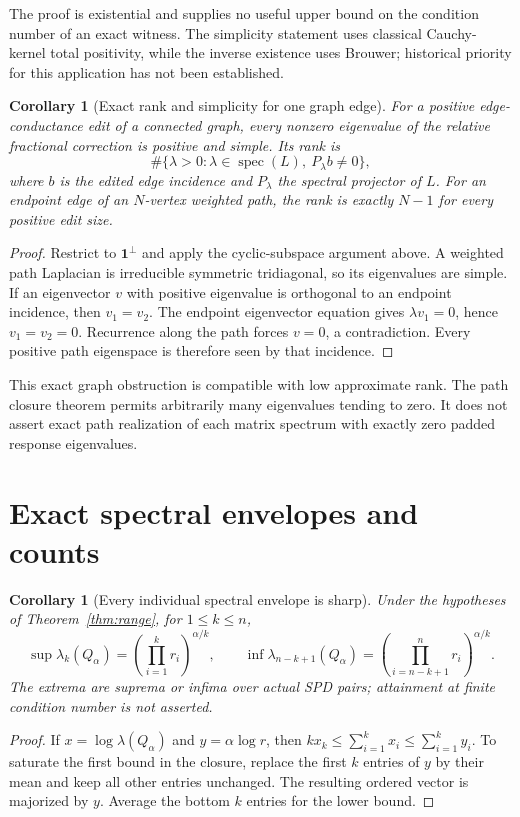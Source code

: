 \documentclass[11pt]{article}
\newtheorem{corollary}[theorem]{Corollary}
\newcommand{\spec}{\operatorname{spec}}
\begin{document}
The proof is existential and supplies no useful upper bound on the
condition number of an exact witness. The simplicity statement uses
classical Cauchy-kernel total positivity, while the inverse existence
uses Brouwer; historical priority for this application has not been
established.

\begin{corollary}[Exact rank and simplicity for one graph edge]
\label{cor:graphsimple}
For a positive edge-conductance edit of a connected graph, every
nonzero eigenvalue of the relative fractional correction is positive
and simple. Its rank is
\[
 \#\{\lambda>0:\lambda\in\spec(L),\ P_\lambda b\ne0\},
\]
where $b$ is the edited edge incidence and $P_\lambda$ the spectral
projector of $L$. For an endpoint edge of an $N$-vertex weighted path,
the rank is exactly $N-1$ for every positive edit size.
\end{corollary}
\begin{proof}
Restrict to $\mathbf1^\perp$ and apply the cyclic-subspace argument
above. A weighted path Laplacian is irreducible symmetric tridiagonal,
so its eigenvalues are simple. If an eigenvector $v$ with positive
eigenvalue is orthogonal to an endpoint incidence, then $v_1=v_2$.
The endpoint eigenvector equation gives $\lambda v_1=0$, hence
$v_1=v_2=0$. Recurrence along the path forces $v=0$, a contradiction.
Every positive path eigenspace is therefore seen by that incidence.
\end{proof}

This exact graph obstruction is compatible with low approximate rank.
The path closure theorem permits arbitrarily many eigenvalues tending
to zero. It does not assert exact path realization of each matrix
spectrum with exactly zero padded response eigenvalues.

\section{Exact spectral envelopes and counts}
\begin{corollary}[Every individual spectral envelope is sharp]
\label{cor:envelope}
Under the hypotheses of Theorem~\ref{thm:range}, for $1\le k\le n$,
\[
 \sup\lambda_k(Q_\alpha)
 =\left(\prod_{i=1}^k r_i\right)^{\alpha/k},
 \qquad
 \inf\lambda_{n-k+1}(Q_\alpha)
 =\left(\prod_{i=n-k+1}^n r_i\right)^{\alpha/k}.
\]
The extrema are suprema or infima over actual SPD pairs; attainment
at finite condition number is not asserted.
\end{corollary}
\begin{proof}
If $x=\log\lambda(Q_\alpha)$ and $y=\alpha\log r$, then
$kx_k\le\sum_{i=1}^kx_i\le\sum_{i=1}^ky_i$.
To saturate the first bound in the closure, replace the first $k$
entries of $y$ by their mean and keep all other entries unchanged.
The resulting ordered vector is majorized by $y$.
Average the bottom $k$ entries for the lower bound.
\end{proof}
\end{document}
